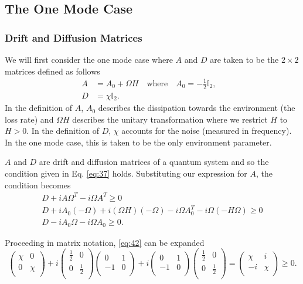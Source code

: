 \documentclass[11pt,a4paper]{article}
\numberwithin{equation}{section}
\begin{document}
	\subsection{The One Mode Case}
	\label{sec:onemode}
	\subsubsection{Drift and Diffusion Matrices}
	\label{sec:onemodedefs}
	We will first consider the one mode case where $A$ and $D$ are taken to be the $2 \times 2$ matrices defined as follows
	\begin{align*}
	A &= A_0 + \Omega H \quad\text{where}\quad A_0 = -\frac{1}{2}\mathbb{I}_2,&\\
	D &= \chi \mathbb{I}_2.&
	\end{align*}
	In the definition of $A$, $A_0$ describes the dissipation towards the environment (the loss rate) and $\Omega H$ describes the unitary transformation where we restrict $H$ to $H>0$. In the definition of $D$, $\chi$ accounts for the noise (measured in frequency). In the one mode case, this is taken to be the only environment parameter. 
	
	$A$ and $D$ are drift and diffusion matrices of a quantum system and so the condition given in Eq. \ref{eq:37} holds. Substituting our expression for $A$, the condition becomes
	\begin{align} 
	&D + iA \Omega^T - i\Omega A^T \geq 0& \nonumber\\
	&D + iA_0 (-\Omega) + i (\Omega H) (-\Omega) - i\Omega A_{0}^{T} - i\Omega (-H\Omega) \geq 0& \nonumber\\
	&D - iA_0 \Omega - i\Omega A_0 \geq 0.& \label{eq:42}
	\end{align}
	
	Proceeding in matrix notation, \ref{eq:42} can be expanded	
	\begin{equation*}
	\begin{pmatrix}
	\chi & 0  \\
	0 & \chi \\
	\end{pmatrix} + i\begin{pmatrix}
	\frac{1}{2} & 0  \\
	0 & \frac{1}{2} \\
	\end{pmatrix}\begin{pmatrix}
	0 & 1  \\
	-1 & 0 \\
	\end{pmatrix} + i\begin{pmatrix}
	0 & 1  \\
	-1 & 0 \\
	\end{pmatrix}\begin{pmatrix}
	\frac{1}{2} & 0  \\
	0 & \frac{1}{2} \\
	\end{pmatrix}=
	\begin{pmatrix}
	\chi & i  \\
	-i & \chi \\
	\end{pmatrix} \geq 0.
	\end{equation*}
\end{document}
